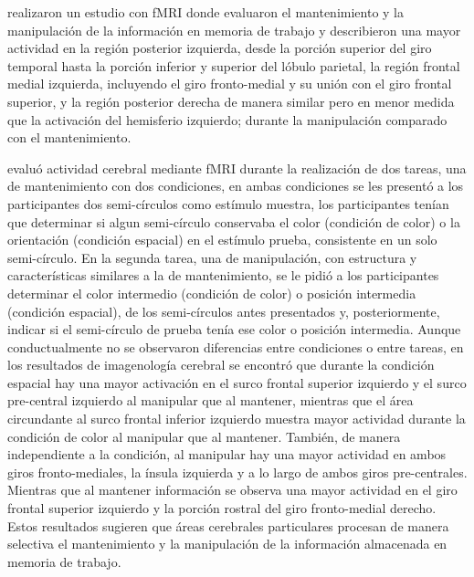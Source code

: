 \documentclass[12pt,letterpaper,final]{article}
\begin{document}
 realizaron un estudio con fMRI donde evaluaron el mantenimiento y la manipulación de la información en  memoria de trabajo y describieron  una mayor actividad en la región posterior izquierda, desde la porción superior del giro temporal hasta la porción inferior y superior del lóbulo parietal, la región frontal medial izquierda, incluyendo el giro fronto-medial y su unión con el giro frontal superior, y la región posterior derecha de manera similar pero en menor medida que la activación del hemisferio izquierdo;  durante la manipulación comparado con el mantenimiento.


 evaluó actividad cerebral mediante fMRI durante la realización de dos tareas, una de mantenimiento con dos condiciones, en ambas condiciones se les presentó a los participantes dos semi-círculos como estímulo  muestra, los participantes tenían que determinar si algun semi-círculo conservaba el color (condición de color) o la orientación (condición espacial) en el estímulo  prueba, consistente en un solo semi-círculo. En la segunda tarea, una de manipulación, con estructura y características similares a la de mantenimiento, se le pidió a los participantes determinar el color intermedio (condición de color) o posición intermedia (condición espacial), de los semi-círculos antes presentados y, posteriormente, indicar si el semi-círculo de prueba tenía ese color o posición intermedia.
Aunque conductualmente no se observaron diferencias entre condiciones o entre tareas, en los resultados de imagenología cerebral se encontró  que durante la condición espacial hay una mayor activación en el surco frontal superior izquierdo y el surco pre-central izquierdo al manipular que al mantener, mientras que el área circundante al surco frontal inferior izquierdo muestra mayor actividad durante la condición de color al manipular que al mantener. 
También, de manera independiente a la condición, al manipular hay una mayor actividad en ambos giros fronto-mediales, la ínsula izquierda y a lo largo de ambos giros pre-centrales. Mientras que al mantener información se observa una mayor actividad en el giro frontal superior izquierdo y la porción rostral del giro fronto-medial derecho. Estos resultados sugieren que áreas cerebrales particulares procesan de manera selectiva el mantenimiento y la manipulación de la información almacenada en memoria de trabajo.
\end{document}
